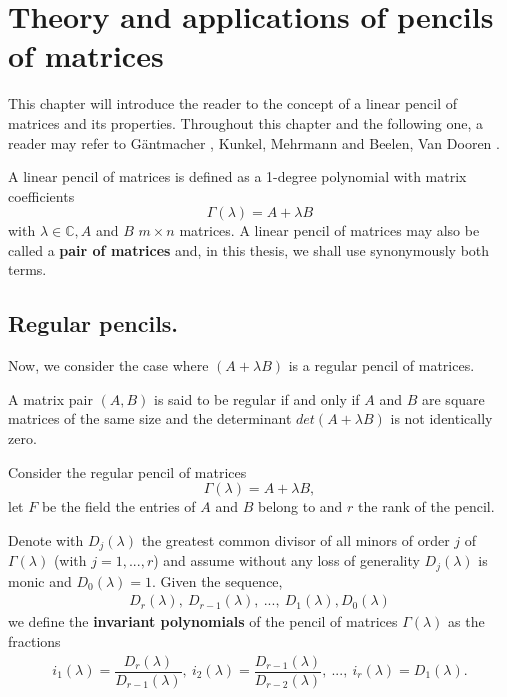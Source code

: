 \section{Theory and applications of pencils of matrices}
This chapter will introduce the reader to the concept of a linear pencil of matrices and its properties. Throughout this
chapter and the following one, a reader may refer to G\"antmacher \cite{gantmacher}, Kunkel, Mehrmann
\cite{kunkel-mehrmann} and Beelen, Van Dooren \cite{beelen-van_dooren}.
\begin{definition}
    A linear pencil of matrices is defined as a 1-degree polynomial with matrix coefficients
    \[
        \Gamma(\lambda) = A + \lambda B
    \]
    with \(\lambda \in \mathbb{C}, A\) and \(B\) \(m \times n\) matrices.
    A linear pencil of matrices may also be called a \textbf{pair of matrices} and, in this thesis, we shall use
    synonymously both terms.
\end{definition}

\subsection*{Regular pencils.}
Now, we consider the case where \((A + \lambda B)\) is a regular pencil of matrices.
\begin{definition}
    A matrix pair \((A, B)\) is said to be regular if and only if \(A\) and \(B\) are square matrices of the same size and
    the determinant \(det(A + \lambda B)\) is not identically zero.
\end{definition}

Consider the regular pencil of matrices
\[\Gamma(\lambda) = A + \lambda B,\]
let \(F\) be the field the entries of \(A\) and \(B\) belong to and \(r\) the rank of the pencil.

Denote with \(D_{j}(\lambda)\) the greatest common divisor of all minors of order \(j\) of \(\Gamma(\lambda)\)
(with \(j = 1, ..., r\)) and assume without any loss of generality \(D_{j}(\lambda)\) is monic and
\(D_{0}(\lambda) = 1\). Given the sequence,
\begin{gather*}
    D_{r}(\lambda), \
    D_{r-1}(\lambda), \
    ..., \
    D_{1}(\lambda), D_{0}(\lambda)
\end{gather*}
we define the \textbf{invariant polynomials} of the pencil of matrices \(\Gamma(\lambda)\) as the fractions
\begin{gather*}
    i_{1}(\lambda) = \dfrac{D_{r}(\lambda)}{D_{r-1}(\lambda)}, \
    i_{2}(\lambda) = \dfrac{D_{r-1}(\lambda)}{D_{r-2}(\lambda)}, \
    ..., \
    i_{r}(\lambda) = D_{1}(\lambda).
\end{gather*}

